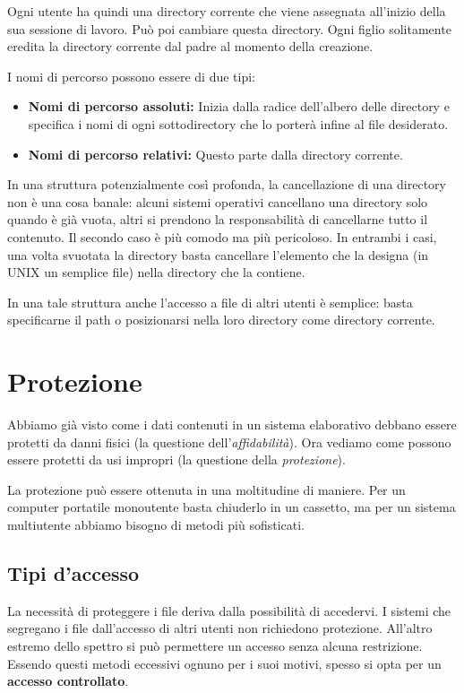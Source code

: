         Ogni utente ha quindi una directory corrente che viene assegnata all'inizio della sua sessione di lavoro. Può poi cambiare questa directory. Ogni figlio solitamente eredita la directory corrente dal padre al momento della creazione.
        
        I nomi di percorso possono essere di due tipi:
        \begin{itemize}
            \item \textbf{Nomi di percorso assoluti:} Inizia dalla radice dell'albero delle directory e specifica i nomi di ogni sottodirectory che lo porterà infine al file desiderato.
            
            \item \textbf{Nomi di percorso relativi:} Questo parte dalla directory corrente.
        \end{itemize}
        
        In una struttura potenzialmente così profonda, la cancellazione di una directory non è una cosa banale: alcuni sistemi operativi cancellano una directory solo quando è già vuota, altri si prendono la responsabilità di cancellarne tutto il contenuto. Il secondo caso è più comodo ma più pericoloso. In entrambi i casi, una volta svuotata la directory basta cancellare l'elemento che la designa (in UNIX un semplice file) nella directory che la contiene.
        
        In una tale struttura anche l'accesso a file di altri utenti è semplice: basta specificarne il path o posizionarsi nella loro directory come directory corrente.
        
\section{Protezione}
    Abbiamo già visto come i dati contenuti in un sistema elaborativo debbano essere protetti da danni fisici (la questione dell'\textit{affidabilità}). Ora vediamo come possono essere protetti da usi impropri (la questione della \textit{protezione}).
    
    La protezione può essere ottenuta in una moltitudine di maniere. Per un computer portatile monoutente basta chiuderlo in un cassetto, ma per un sistema multiutente abbiamo bisogno di metodi più sofisticati.
    
    \subsection{Tipi d'accesso}
        La necessità di proteggere i file deriva dalla possibilità di accedervi. I sistemi che segregano i file dall'accesso di altri utenti non richiedono protezione. All'altro estremo dello spettro si può permettere un accesso senza alcuna restrizione. Essendo questi metodi eccessivi ognuno per i suoi motivi, spesso si opta per un \textbf{accesso controllato}.
        
